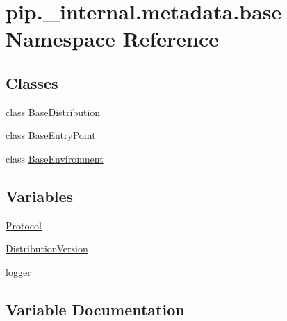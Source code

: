 \hypertarget{namespacepip_1_1__internal_1_1metadata_1_1base}{}\section{pip.\+\_\+internal.\+metadata.\+base Namespace Reference}
\label{namespacepip_1_1__internal_1_1metadata_1_1base}
\subsection*{Classes}
\begin{DoxyCompactItemize}
\item 
class \hyperlink{classpip_1_1__internal_1_1metadata_1_1base_1_1BaseDistribution}{Base\+Distribution}
\item 
class \hyperlink{classpip_1_1__internal_1_1metadata_1_1base_1_1BaseEntryPoint}{Base\+Entry\+Point}
\item 
class \hyperlink{classpip_1_1__internal_1_1metadata_1_1base_1_1BaseEnvironment}{Base\+Environment}
\end{DoxyCompactItemize}
\subsection*{Variables}
\begin{DoxyCompactItemize}
\item 
\hyperlink{namespacepip_1_1__internal_1_1metadata_1_1base_aae0fa12692e86d93d1bceee5f24f605f}{Protocol}
\item 
\hyperlink{namespacepip_1_1__internal_1_1metadata_1_1base_a4e3aee58a8b3eb8f14cb6e1a23281596}{Distribution\+Version}
\item 
\hyperlink{namespacepip_1_1__internal_1_1metadata_1_1base_a4ca459210efac1408a1566f4966d2558}{logger}
\end{DoxyCompactItemize}


\subsection{Variable Documentation}
\mbox{\label{namespacepip_1_1__internal_1_1metadata_1_1base_a4e3aee58a8b3eb8f14cb6e1a23281596}} 
